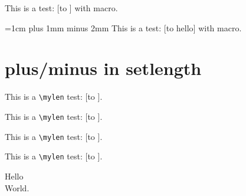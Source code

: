\documentclass{revtex4-1}
\begin{document}

\def\dimenx{\dimen}
This is a test: [\hbox to \dimenx {}] with macro. %

=1cm plus 1mm minus 2mm %
This is a test: [\hbox to  {hello}] with macro. %


\section{plus/minus in setlength}

\newlength{\mylen}
\setlength{\mylen}{1cm plus 1cm minus 1cm} %
This is a \verb+\mylen+ test: [\hbox to ]. %

\setlength{\mylen}{1cm plus 2cm plus 3cm} %
This is a \verb+\mylen+ test: [\hbox to ].

\setlength{\mylen}{1cm minus 2mm plus 3mm} %
This is a \verb+\mylen+ test: [\hbox to ].

\setlength{\mylen}{1cm plus 0.02\textwidth minus 0.01\textwidth} %
This is a \verb+\mylen+ test: [\hbox to ].

Hello\\[1mm plus 1cm] World.
\end{document}
